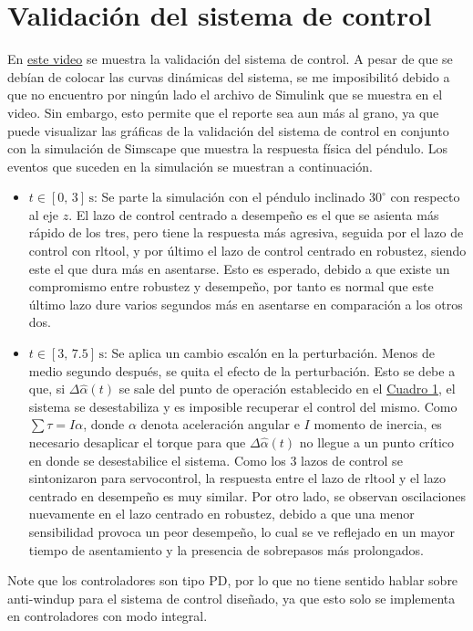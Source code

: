 \section{Validación del sistema de control}
En \href{https://youtu.be/ISYTeRPDpHw?si=HoDpNC0XWb7yOUdD}{este video} se muestra la 
validación del sistema de control.
A pesar de que se debían de colocar las curvas dinámicas del sistema, se me imposibilitó debido
a que no encuentro por ningún lado el archivo de Simulink que se muestra en el video. 
Sin embargo, esto permite que el reporte sea aun más al grano, 
ya que puede visualizar las gráficas de la validación del sistema de control en conjunto
con la simulación de Simscape que muestra la respuesta física del péndulo.
Los eventos que suceden en la simulación se muestran a continuación.
\begin{itemize}
    \item $t\in[0,\,3]\,\text{s}$: Se parte la simulación con el péndulo inclinado $30^\circ$ con respecto al eje $z$.
        El lazo de control centrado a desempeño es el que se asienta más rápido de los tres, pero tiene la respuesta más agresiva,
        seguida por el lazo de control con rltool, y por último el lazo de control centrado en robustez, siendo este el que dura más 
        en asentarse.
        Esto es esperado, debido a que existe un compromismo entre robustez y desempeño, por tanto es normal que este último lazo
        dure varios segundos más en asentarse en comparación a los otros dos.

    \item $t\in[3,\,7.5]\,\text{s}$: Se aplica un cambio escalón en la perturbación.
        Menos de medio segundo después, se quita el efecto de la perturbación.
        Esto se debe a que, si $\Delta \widehat{\alpha}(t)$ se sale del punto de operación
        establecido en el \hyperref[t1]{Cuadro 1}, el sistema se desestabiliza y es imposible
        recuperar el control del mismo.
        Como $\sum \tau = I\alpha$, donde $\alpha$ denota aceleración angular e $I$ momento de inercia, es necesario desaplicar
        el torque para que $\Delta \widehat{\alpha}(t)$ no llegue a un punto crítico en donde se desestabilice el
        sistema.
        Como los 3 lazos de control se sintonizaron para servocontrol, la respuesta entre el lazo de rltool y el lazo centrado en desempeño
        es muy similar. Por otro lado, se observan oscilaciones nuevamente en el lazo centrado en robustez, debido a que una menor sensibilidad
        provoca un peor desempeño, lo cual se ve reflejado en un mayor tiempo de asentamiento y la presencia de sobrepasos más prolongados.
\end{itemize}

Note que los controladores son tipo PD, por lo que no tiene sentido hablar sobre anti-windup para el sistema de control
diseñado, ya que esto solo se implementa en controladores con modo integral.
